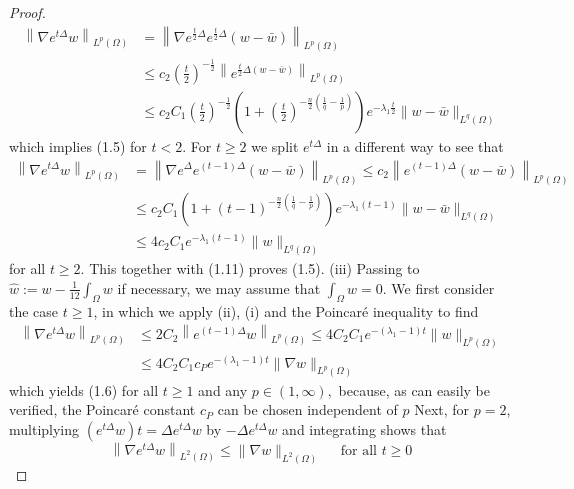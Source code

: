 \begin{proof}
	$$
	\begin{aligned}
		\left\|\nabla e^{t \Delta} w\right\|_{L^{p}(\Omega)} &=\left\|\nabla e^{\frac{t}{2} \Delta} e^{\frac{t}{2} \Delta}(w-\bar{w})\right\|_{L^{p}(\Omega)} \\
		& \leqslant c_{2}\left(\frac{t}{2}\right)^{-\frac{1}{2}}\left\|e^{\frac{t}{2} \Delta(w-\bar{w})}\right\|_{L^{p}(\Omega)} \\
		& \leqslant c_{2} C_{1}\left(\frac{t}{2}\right)^{-\frac{1}{2}}\left(1+\left(\frac{t}{2}\right)^{-\frac{n}{2}\left(\frac{1}{q}-\frac{1}{p}\right)}\right) e^{-\lambda_{1} \frac{t}{2}}\|w-\bar{w}\|_{L^{q}(\Omega)}
	\end{aligned}
	$$
	which implies (1.5) for $t<2 .$ For $t \geqslant 2$ we split $e^{t \Delta}$ in a different way to see that
	$$
	\begin{aligned}
		\left\|\nabla e^{t \Delta} w\right\|_{L^{p}(\Omega)} &=\left\|\nabla e^{\Delta} e^{(t-1) \Delta}(w-\bar{w})\right\|_{L^{p}(\Omega)} \leqslant c_{2}\left\|e^{(t-1) \Delta}(w-\bar{w})\right\|_{L^{p}(\Omega)} \\
		& \leqslant c_{2} C_{1}\left(1+(t-1)^{-\frac{n}{2}\left(\frac{1}{q}-\frac{1}{p}\right)}\right) e^{-\lambda_{1}(t-1)}\|w-\bar{w}\|_{L^{q}(\Omega)} \\
		& \leqslant 4 c_{2} C_{1} e^{-\lambda_{1}(t-1)}\|w\|_{L^{q}(\Omega)}
	\end{aligned}
	$$
	for all $t \geqslant 2 .$ This together with (1.11) proves (1.5).
	(iii) Passing to $\hat{w}:=w-\frac{1}{12} \int_{\Omega} w$ if necessary, we may assume that $\int_{\Omega} w=0 .$ We first consider the case $t \geqslant 1$, in which we apply (ii), (i) and the Poincaré inequality to find
	$$
	\begin{aligned}
		\left\|\nabla e^{t \Delta} w\right\|_{L^{p}(\Omega)} & \leqslant 2 C_{2}\left\|e^{(t-1) \Delta} w\right\|_{L^{p}(\Omega)} \leqslant 4 C_{2} C_{1} e^{-\left(\lambda_{1}-1\right) t}\|w\|_{L^{p}(\Omega)} \\
		& \leqslant 4 C_{2} C_{1} c_{P} e^{-\left(\lambda_{1}-1\right) t}\|\nabla w\|_{L^{p}(\Omega)}
	\end{aligned}
	$$
	which yields (1.6) for all $t \geqslant 1$ and any $p \in(1, \infty),$ because, as can easily be verified, the Poincaré constant $c_{P}$ can be chosen independent of $p$ Next, for $p=2$, multiplying $\left(e^{t \Delta} w\right) t=\Delta e^{t \Delta} w$ by $-\Delta e^{t \Delta} w$ and integrating shows that
	$$
	\left\|\nabla e^{t \Delta} w\right\|_{L^{2}(\Omega)} \leqslant\|\nabla w\|_{L^{2}(\Omega)} \quad \text { for all } t \geqslant 0
$$
\end{proof}
